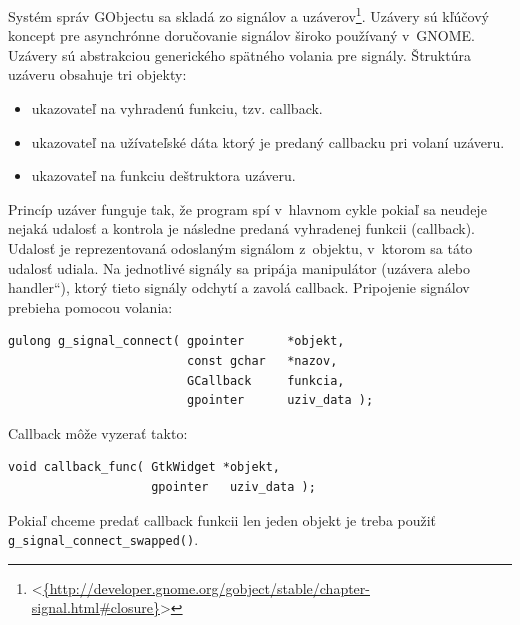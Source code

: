 \documentclass[12pt,oneside,final]{fithesis2}
\newcommand\uv[1]{\quotedblbase #1\textquotedblleft}
\begin{document}
Systém správ GObjectu sa skladá zo signálov a uzáverov\footnote{<\url{{http://developer.gnome.org/gobject/stable/chapter-signal.html\#closure}}>}. Uzávery sú kľúčový koncept pre asynchrónne doručovanie signálov široko používaný v~GNOME. Uzávery sú abstrakciou generického spätného volania pre signály. Štruktúra uzáveru obsahuje tri objekty:
\begin{itemize}
\item ukazovateľ na vyhradenú funkciu, tzv. callback.
\item ukazovateľ na užívateľské dáta ktorý je predaný callbacku pri volaní uzáveru.
\item ukazovateľ na funkciu deštruktora uzáveru.
\end{itemize}
Princíp uzáver funguje tak, že program spí v~hlavnom cykle pokiaľ sa neudeje nejaká udalosť a kontrola je následne predaná vyhradenej funkcii (callback). Udalosť je reprezentovaná odoslaným signálom z~objektu, v~ktorom sa táto udalosť udiala. Na jednotlivé signály sa pripája manipulátor (uzávera alebo \uv{handler}), ktorý tieto signály odchytí a zavolá callback. Pripojenie signálov prebieha pomocou volania:
\begin{verbatim}
gulong g_signal_connect( gpointer      *objekt,
                         const gchar   *nazov,
                         GCallback     funkcia,
                         gpointer      uziv_data );
\end{verbatim} Callback môže vyzerať takto: 
\begin{verbatim}
void callback_func( GtkWidget *objekt,
                    gpointer   uziv_data );
\end{verbatim}
Pokiaľ chceme predať callback funkcii len jeden objekt je treba použiť \texttt{g\_\-signal\_\-connect\_\-swapped()}.
\end{document}
